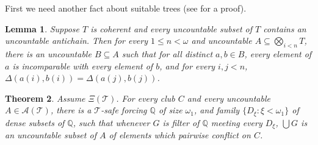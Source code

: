 \documentclass[10pt,a4paper]{amsart}
\newtheorem{theorem}{Theorem}[section]
\newtheorem{lemma}[theorem]{Lemma}
\theoremstyle{definition}
\newcommand{\Q}{\mathbb{Q}}
\newcommand{\seb}{\subseteq}
\newcommand{\1}{\mathbf{1}}
\newcommand{\T}{\mathcal{T}}
\newcommand{\prop}{\Xi}
\begin{document}
First we need another fact about suitable trees
(see \cite{TodorcevicWalks} for a proof).

\begin{lemma}\label{lem:tuples}
  Suppose $T$ is coherent and every uncountable subset of $T$
  contains an uncountable antichain. Then for every $1 \le n < \omega$
  and uncountable $A \seb \bigotimes_{i < n}T$, 
  there is an uncountable $B \seb A$
  such that for all distinct $a,b \in B$, every element
  of $a$ is incomparable with every element of $b$, and for every
  $i,j < n$, $\Delta(a(i),b(i)) = \Delta(a(j),b(j))$.
\end{lemma}

\begin{theorem}\label{thm:crux}
  Assume $\prop(\T)$. For every club $C$
  and every uncountable $A \in \mathcal{A}(\T)$,
  there is a $\T$-safe forcing $\Q$ of
  size $\omega_{1}$, and family
  $\{D_{\xi} : \xi < \omega_{1}\}$ of dense subsets of $\Q$,
  such that whenever $G$ is filter of $\Q$ meeting every
  $D_{\xi}$, $\bigcup G$ is an uncountable subset of $A$ of elements which
  pairwise conflict on $C$.
\end{theorem}
\end{document}
